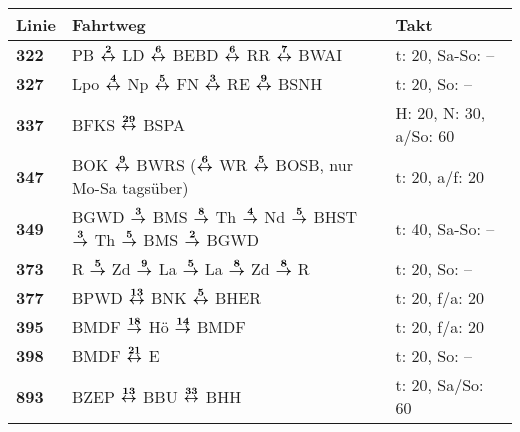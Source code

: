 \begin{minipage}[t]{0.45\textwidth}
\begin{tabular}{>{\bfseries}L{1.2cm}L{9.0cm}L{3.0cm}}
{\bfseries Linie} & {\bfseries Fahrtweg} & {\bfseries Takt} \\
\hline
\bus{} 322    & PB $\boldsymbol{\overset{2}{\leftrightarrow}}$ LD $\boldsymbol{\overset{6}{\leftrightarrow}}$ BEBD $\boldsymbol{\overset{6}{\leftrightarrow}}$ RR $\boldsymbol{\overset{7}{\leftrightarrow}}$ BWAI                                                                                                  & t: 20, Sa-So: --           \\
\bus{} 327    & Lpo $\boldsymbol{\overset{4}{\leftrightarrow}}$ Np $\boldsymbol{\overset{5}{\leftrightarrow}}$ FN $\boldsymbol{\overset{3}{\leftrightarrow}}$ RE $\boldsymbol{\overset{9}{\leftrightarrow}}$ BSNH                                                                                                   & t: 20, So: --              \\
\bus{} 337    & BFKS $\boldsymbol{\overset{29}{\leftrightarrow}}$ BSPA                                                                                                                                              & H: 20, N: 30, a/So: 60     \\
\bus{} 347    & BOK $\boldsymbol{\overset{9}{\leftrightarrow}}$ BWRS ($\boldsymbol{\overset{6}{\leftrightarrow}}$ WR $\boldsymbol{\overset{5}{\leftrightarrow}}$ BOSB, nur Mo-Sa tagsüber)                                                                                          & t: 20, a/f: 20             \\
\bus{} 349    & BGWD $\boldsymbol{\overset{3}{\rightarrow}}$ BMS $\boldsymbol{\overset{8}{\rightarrow}}$ Th $\boldsymbol{\overset{4}{\rightarrow}}$ Nd $\boldsymbol{\overset{5}{\rightarrow}}$ BHST $\boldsymbol{\overset{3}{\rightarrow}}$ Th $\boldsymbol{\overset{5}{\rightarrow}}$ BMS $\boldsymbol{\overset{2}{\rightarrow}}$ BGWD                                                 & t: 40, Sa-So: --           \\
\bus{} 373    & R $\boldsymbol{\overset{5}{\rightarrow}}$ Zd $\boldsymbol{\overset{9}{\rightarrow}}$ La $\boldsymbol{\overset{5}{\rightarrow}}$ La $\boldsymbol{\overset{8}{\rightarrow}}$ Zd $\boldsymbol{\overset{8}{\rightarrow}}$ R                                                                                         & t: 20, So: --              \\
\bus{} 377    & BPWD $\boldsymbol{\overset{13}{\leftrightarrow}}$ BNK $\boldsymbol{\overset{5}{\leftrightarrow}}$ BHER                                                                                                                              & t: 20, f/a: 20             \\
\bus{} 395    & BMDF $\boldsymbol{\overset{18}{\rightarrow}}$ Hö $\boldsymbol{\overset{14}{\rightarrow}}$ BMDF                                                                                                                              & t: 20, f/a: 20             \\
\bus{} 398    & BMDF $\boldsymbol{\overset{21}{\leftrightarrow}}$ E                                                                                                                                                 & t: 20, So: --              \\
\bus{} 893    & BZEP $\boldsymbol{\overset{13}{\leftrightarrow}}$ BBU $\boldsymbol{\overset{33}{\leftrightarrow}}$ BHH                                                                                                                              & t: 20, Sa/So: 60           \\
\hline
\end{tabular}
\end{minipage}
\begin{minipage}[t]{0.05\textwidth}
\phantom{Tor}
\end{minipage}
\fi
